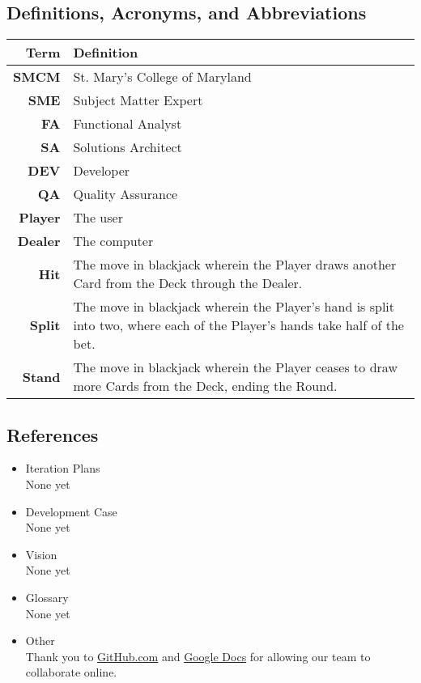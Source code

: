 \documentclass[12pt]{article}
\begin{document}
\subsection{Definitions, Acronyms, and Abbreviations}
\begin{table}[h]
\begin{tabularx}{\linewidth}{|r|X|}
\hline 
\textbf{Term} & Definition \\ \hline 
\textbf{SMCM} & St. Mary's College of Maryland \\ \hline 
\textbf{SME} & Subject Matter Expert \\ \hline 
\textbf{FA} & Functional Analyst \\ \hline 
\textbf{SA} & Solutions Architect \\ \hline 
\textbf{DEV} & Developer \\ \hline 
\textbf{QA} & Quality Assurance \\ \hline 
\textbf{Player} & The user \\ \hline 
\textbf{Dealer} & The computer \\ \hline 
\textbf{Hit} & The move in blackjack wherein the Player draws another Card from
the Deck through the Dealer. \\ \hline 
\textbf{Split} & The move in blackjack wherein the Player's hand is split into
two, where each of the Player's hands take half of the bet. \\ \hline 
\textbf{Stand} & The move in blackjack wherein the Player ceases to draw more
Cards from the Deck, ending the Round. \\ \hline 
\end{tabularx}
\end{table}


\subsection{References}
\begin{itemize}
\item Iteration Plans \\ None yet
\item Development Case \\ None yet
\item Vision \\ None yet
\item Glossary \\ None yet
\item Other \\ Thank you to \href{http://www.github.com/vermiculus/se-blackjack}{GitHub.com} and \href{http://drive.google.com}{Google Docs} for allowing our team to collaborate
online.
\end{itemize}
\end{document}
